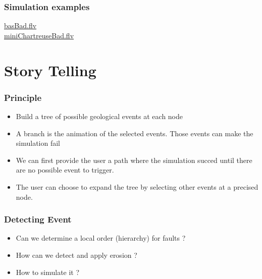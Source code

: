 \documentclass{beamer}
\begin{document}
    \begin{frame} 
    \frametitle{Simulation examples}
    \url{basBad.flv}
    \\
    \url{miniChartreuseBad.flv}
    \end{frame}
	\section{Story Telling}
	
    \begin{frame}
    \frametitle{Principle}
    \begin{itemize}
    \item Build a tree of possible geological events at each node
    \item A branch is the animation of the selected events. Those events can make the simulation fail
    \item We can first provide the user a path where the simulation succed until there are no possible event to trigger.
    \item The user can choose to expand the tree by selecting other events at a precised node. 
    \end{itemize}
	\end{frame}
	
	\begin{frame}
	\frametitle{Detecting Event}
	\begin{itemize}
	\item Can we determine a local order (hierarchy) for faults ? 
	\item How can we detect and apply erosion ?
	\item How to simulate it ?
	\end{itemize}
	\end{frame}
	
            
\end{document}
